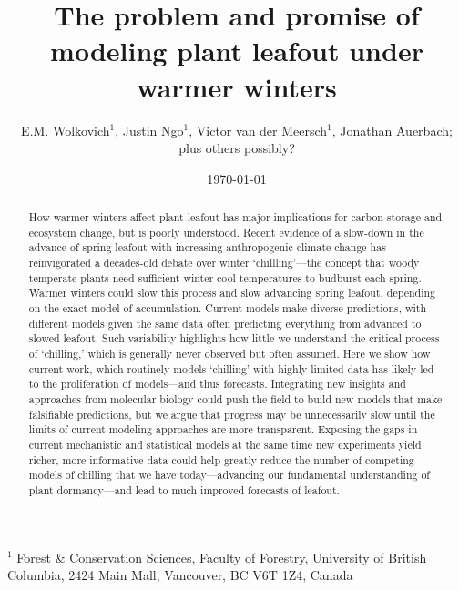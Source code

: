 \documentclass[11pt]{article}
\begin{document}
\renewcommand{\refname}{\CHead{}}


\title{The problem and promise of \\ modeling plant leafout under warmer winters} %
\author{E.M. Wolkovich$^1$, Justin Ngo$^1$, Victor van der Meersch$^1$, Jonathan Auerbach; \\ plus others possibly?} %
\date{\today}
\maketitle

$^1$ Forest \& Conservation Sciences, Faculty of Forestry, University of British Columbia, 2424 Main Mall, Vancouver, BC V6T 1Z4, Canada\\


\begin{abstract} %
How warmer winters affect plant leafout has major implications for carbon storage and ecosystem change, but is poorly understood. 
Recent evidence of a slow-down in the advance of spring leafout with increasing anthropogenic climate change has reinvigorated a decades-old debate over winter `chillling'---the concept that woody temperate plants need sufficient winter cool temperatures to budburst each spring. Warmer winters could slow this process and slow advancing spring leafout, depending on the exact model of accumulation. Current models make diverse predictions, with different models given the same data often predicting everything from advanced to slowed leafout. Such variability highlights how little we understand the critical process of `chilling,' which is generally never observed but often assumed. Here we show how current work, which routinely models `chilling' with highly limited data has likely led to the proliferation of models---and thus forecasts. Integrating new insights and approaches from molecular biology could push the field to build new models that make falsifiable predictions, but we argue that progress may be unnecessarily slow until the limits of current modeling approaches are more transparent. Exposing the gaps in current mechanistic and statistical models at the same time new experiments yield richer, more informative data could help greatly reduce the number of competing models of chilling that we have today---advancing our fundamental understanding of plant dormancy---and lead to much improved forecasts of leafout. 
\end{abstract}
\end{document}
